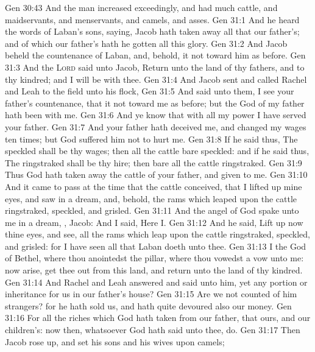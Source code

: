 \vs Gen 30:43 And the man increased exceedingly, and had much cattle, and maidservants, and menservants, and camels, and asses.
\vs Gen 31:1 And he heard the words of Laban's sons, saying, Jacob hath taken away all that  our father's; and of  which  our father's hath he gotten all this glory.
\vs Gen 31:2 And Jacob beheld the countenance of Laban, and, behold, it  not toward him as before.
\vs Gen 31:3 And the \textsc{Lord} said unto Jacob, Return unto the land of thy fathers, and to thy kindred; and I will be with thee.
\vs Gen 31:4 And Jacob sent and called Rachel and Leah to the field unto his flock,
\vs Gen 31:5 And said unto them, I see your father's countenance, that it  not toward me as before; but the God of my father hath been with me.
\vs Gen 31:6 And ye know that with all my power I have served your father.
\vs Gen 31:7 And your father hath deceived me, and changed my wages ten times; but God suffered him not to hurt me.
\vs Gen 31:8 If he said thus, The speckled shall be thy wages; then all the cattle bare speckled: and if he said thus, The ringstraked shall be thy hire; then bare all the cattle ringstraked.
\vs Gen 31:9 Thus God hath taken away the cattle of your father, and given  to me.
\vs Gen 31:10 And it came to pass at the time that the cattle conceived, that I lifted up mine eyes, and saw in a dream, and, behold, the rams which leaped upon the cattle  ringstraked, speckled, and grisled.
\vs Gen 31:11 And the angel of God spake unto me in a dream, , Jacob: And I said, Here  I.
\vs Gen 31:12 And he said, Lift up now thine eyes, and see, all the rams which leap upon the cattle  ringstraked, speckled, and grisled: for I have seen all that Laban doeth unto thee.
\vs Gen 31:13 I  the God of Bethel, where thou anointedst the pillar,  where thou vowedst a vow unto me: now arise, get thee out from this land, and return unto the land of thy kindred.
\vs Gen 31:14 And Rachel and Leah answered and said unto him,  yet any portion or inheritance for us in our father's house?
\vs Gen 31:15 Are we not counted of him strangers? for he hath sold us, and hath quite devoured also our money.
\vs Gen 31:16 For all the riches which God hath taken from our father, that  ours, and our children's: now then, whatsoever God hath said unto thee, do.
\vs Gen 31:17 Then Jacob rose up, and set his sons and his wives upon camels;
